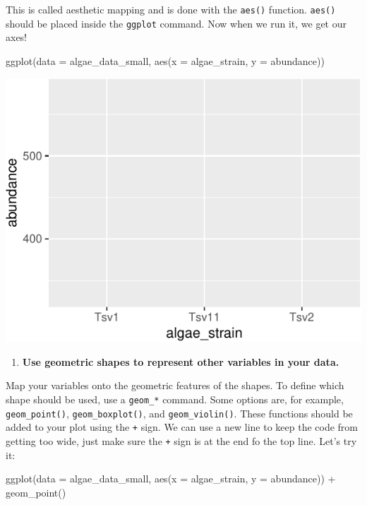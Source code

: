 \documentclass[
]{krantz}
\newenvironment{Shaded}{\begin{snugshade}}{\end{snugshade}}
\newcommand{\AttributeTok}[1]{\textcolor[rgb]{0.77,0.63,0.00}{#1}}
\newcommand{\FunctionTok}[1]{\textcolor[rgb]{0.00,0.00,0.00}{#1}}
\newcommand{\NormalTok}[1]{#1}
\newcommand{\SpecialCharTok}[1]{\textcolor[rgb]{0.00,0.00,0.00}{#1}}
\providecommand{\tightlist}{%
  \setlength{\itemsep}{0pt}\setlength{\parskip}{0pt}}
\begin{document}
This is called aesthetic mapping and is done with the \texttt{aes()} function. \texttt{aes()} should be placed inside the \texttt{ggplot} command. Now when we run it, we get our axes!

\begin{Shaded}
\begin{Highlighting}[]
\FunctionTok{ggplot}\NormalTok{(}\AttributeTok{data =}\NormalTok{ algae\_data\_small, }\FunctionTok{aes}\NormalTok{(}\AttributeTok{x =}\NormalTok{ algae\_strain, }\AttributeTok{y =}\NormalTok{ abundance))}
\end{Highlighting}
\end{Shaded}

\begin{center}\includegraphics[width=0.8\linewidth]{index_files/figure-latex/unnamed-chunk-22-1} \end{center}

\begin{enumerate}
\def\labelenumi{\arabic{enumi}.}
\setcounter{enumi}{2}
\tightlist
\item
  \textbf{Use geometric shapes to represent other variables in your data.}
\end{enumerate}

Map your variables onto the geometric features of the shapes. To define which shape should be used, use a \texttt{geom\_*} command. Some options are, for example, \texttt{geom\_point()}, \texttt{geom\_boxplot()}, and \texttt{geom\_violin()}. These functions should be added to your plot using the \texttt{+} sign. We can use a new line to keep the code from getting too wide, just make sure the \texttt{+} sign is at the end fo the top line. Let's try it:

\begin{Shaded}
\begin{Highlighting}[]
\FunctionTok{ggplot}\NormalTok{(}\AttributeTok{data =}\NormalTok{ algae\_data\_small, }\FunctionTok{aes}\NormalTok{(}\AttributeTok{x =}\NormalTok{ algae\_strain, }\AttributeTok{y =}\NormalTok{ abundance)) }\SpecialCharTok{+}
  \FunctionTok{geom\_point}\NormalTok{()}
\end{Highlighting}
\end{Shaded}
\end{document}
